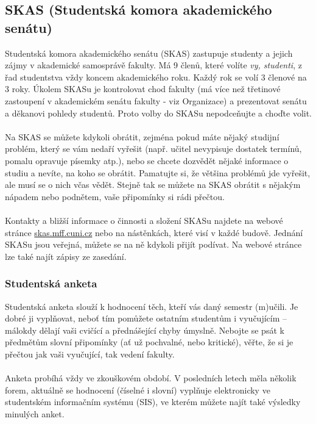 \subsection[Studentská komora AS]{SKAS (Studentská komora akademického senátu)}
Studentská komora akademického senátu (SKAS) zastupuje studenty a jejich zájmy v
akademické samosprávě fakulty. Má 9 členů, které volíte \textit{vy, studenti}, z
řad studentstva vždy koncem akademického roku. Každý rok se volí 3 členové na 3
roky. Úkolem SKASu je kontrolovat chod fakulty (má více než třetinové zastoupení
v akademickém senátu fakulty - viz Organizace) a prezentovat senátu a děkanovi
pohledy studentů. Proto volby do SKASu nepodceňujte a choďte volit.
\\\\
Na SKAS se můžete kdykoli obrátit, zejména pokud máte nějaký studijní problém,
který se vám nedaří vyřešit (např. učitel nevypisuje dostatek termínů, pomalu
opravuje písemky atp.), nebo se chcete dozvědět nějaké informace o studiu a
nevíte, na koho se obrátit. Pamatujte si, že většina problémů jde vyřešit, ale
musí se o nich včas vědět. Stejně tak se můžete na SKAS obrátit s nějakým
nápadem nebo podnětem, vaše připomínky si rádi přečtou.
\\\\
Kontakty a bližší informace o činnosti a složení SKASu najdete na webové stránce
\url{skas.mff.cuni.cz} nebo na nástěnkách, které visí v každé budově. Jednání
SKASu jsou veřejná, můžete se na ně kdykoli přijít podívat. Na webové stránce
lze také najít zápisy ze zasedání.


\subsubsection{Studentská anketa}
Studentská anketa slouží k hodnocení těch, kteří vás daný semestr (m)učili. Je
dobré ji vyplňovat, neboť tím pomůžete ostatním studentům i vyučujícím – málokdy
dělají vaši cvičící a přednášející chyby úmyslně. Nebojte se psát k předmětům
slovní připomínky (ať už pochvalné, nebo kritické), věřte, že si je přečtou jak
vaši vyučující, tak vedení fakulty.
\\\\
Anketa probíhá vždy ve zkouškovém období. V posledních letech měla několik
forem, aktuálně se hodnocení (číselné i slovní) vyplňuje elektronicky ve
studentském informačním systému (SIS), ve kterém můžete najít také výsledky
minulých anket.